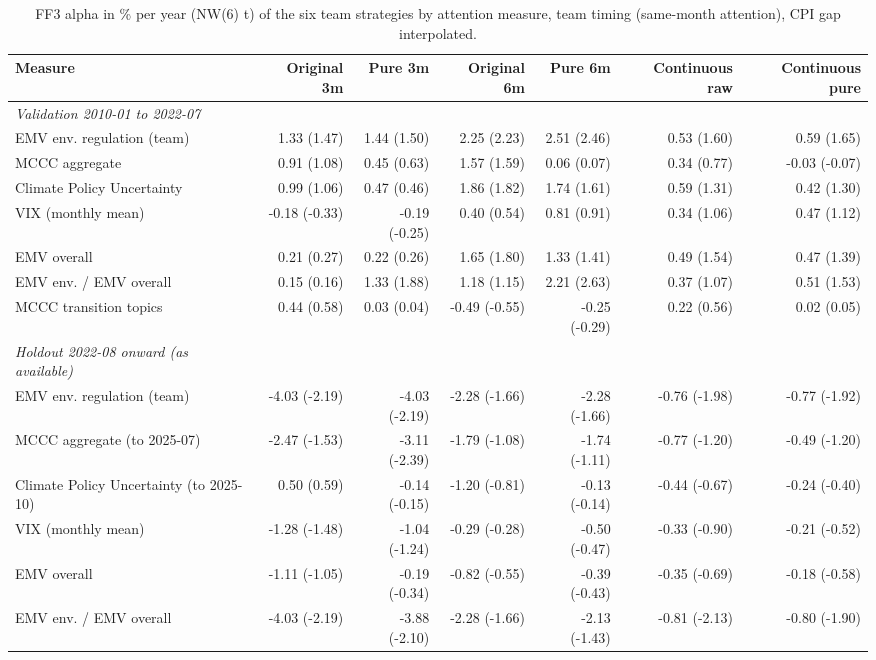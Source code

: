 \begin{table}[htbp]
\centering
\footnotesize
\caption{FF3 alpha in \% per year (NW(6) t) of the six team strategies by attention measure, team timing (same-month attention), CPI gap interpolated.}
\label{tab:m1b_alpha_grid_same_month}
\begin{tabular}{lrrrrrr}
\toprule
Measure & Original 3m & Pure 3m & Original 6m & Pure 6m & Continuous raw & Continuous pure \\
\midrule
\textit{Validation 2010-01 to 2022-07} &  &  &  &  &  &  \\
EMV env. regulation (team) & 1.33 (1.47) & 1.44 (1.50) & 2.25 (2.23) & 2.51 (2.46) & 0.53 (1.60) & 0.59 (1.65) \\
MCCC aggregate & 0.91 (1.08) & 0.45 (0.63) & 1.57 (1.59) & 0.06 (0.07) & 0.34 (0.77) & -0.03 (-0.07) \\
Climate Policy Uncertainty & 0.99 (1.06) & 0.47 (0.46) & 1.86 (1.82) & 1.74 (1.61) & 0.59 (1.31) & 0.42 (1.30) \\
VIX (monthly mean) & -0.18 (-0.33) & -0.19 (-0.25) & 0.40 (0.54) & 0.81 (0.91) & 0.34 (1.06) & 0.47 (1.12) \\
EMV overall & 0.21 (0.27) & 0.22 (0.26) & 1.65 (1.80) & 1.33 (1.41) & 0.49 (1.54) & 0.47 (1.39) \\
EMV env. / EMV overall & 0.15 (0.16) & 1.33 (1.88) & 1.18 (1.15) & 2.21 (2.63) & 0.37 (1.07) & 0.51 (1.53) \\
MCCC transition topics & 0.44 (0.58) & 0.03 (0.04) & -0.49 (-0.55) & -0.25 (-0.29) & 0.22 (0.56) & 0.02 (0.05) \\
\textit{Holdout 2022-08 onward (as available)} &  &  &  &  &  &  \\
EMV env. regulation (team) & -4.03 (-2.19) & -4.03 (-2.19) & -2.28 (-1.66) & -2.28 (-1.66) & -0.76 (-1.98) & -0.77 (-1.92) \\
MCCC aggregate (to 2025-07) & -2.47 (-1.53) & -3.11 (-2.39) & -1.79 (-1.08) & -1.74 (-1.11) & -0.77 (-1.20) & -0.49 (-1.20) \\
Climate Policy Uncertainty (to 2025-10) & 0.50 (0.59) & -0.14 (-0.15) & -1.20 (-0.81) & -0.13 (-0.14) & -0.44 (-0.67) & -0.24 (-0.40) \\
VIX (monthly mean) & -1.28 (-1.48) & -1.04 (-1.24) & -0.29 (-0.28) & -0.50 (-0.47) & -0.33 (-0.90) & -0.21 (-0.52) \\
EMV overall & -1.11 (-1.05) & -0.19 (-0.34) & -0.82 (-0.55) & -0.39 (-0.43) & -0.35 (-0.69) & -0.18 (-0.58) \\
EMV env. / EMV overall & -4.03 (-2.19) & -3.88 (-2.10) & -2.28 (-1.66) & -2.13 (-1.43) & -0.81 (-2.13) & -0.80 (-1.90) \\

\end{tabular}
\end{table}
